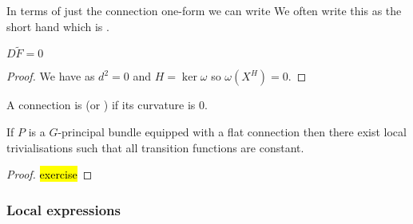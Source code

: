 \documentclass{article}
\begin{document}
\begin{prop}
	In terms of just the connection one-form we can write 
We often write this as the short hand 
which is . 
\end{prop}

\begin{theorem}
	$D \tilde{F} = 0$
\end{theorem}
\begin{proof}
	We have
as $d^2 = 0$ and $H=\ker \omega$ so $\omega(X^H)=0$. 
\end{proof}

\begin{definition}
	A connection is  (or ) if its curvature is 0. 
\end{definition}

\begin{theorem}
	If $P$ is a $G$-principal bundle equipped with a flat connection then there exist local trivialisations such that all transition functions are constant. 
\end{theorem}
\begin{proof}
	\hl{exercise}
\end{proof}
\subsubsection{Local expressions}
\end{document}
